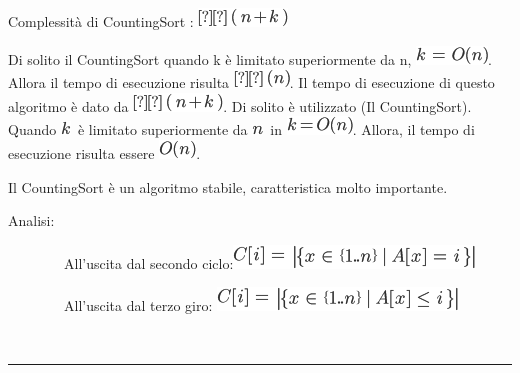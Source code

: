\documentclass{article}
\begin{document}
{Complessità di CountingSort : }\includegraphics{images/image188.png}

{}

{Di solito il CountingSort quando k è limitato superiormente da n,
}\includegraphics{images/image189.png}{. Allora il tempo di esecuzione
risulta }\includegraphics{images/image190.png}{. }{Il tempo di
esecuzione di questo algoritmo è dato da
}\includegraphics{images/image188.png}{. Di solito è utilizzato (Il
CountingSort). Quando }\includegraphics{images/image118.png}{~è limitato
superiormente da }\includegraphics{images/image41.png}{~in
}\includegraphics{images/image191.png}{. Allora, il tempo di esecuzione
risulta essere }\includegraphics{images/image146.png}{.}

{}

{Il CountingSort è un algoritmo stabile, caratteristica molto
importante.}

{}

{Analisi:}

{~~~~~~~~All'uscita dal secondo
ciclo:}\includegraphics{images/image192.png}

{~~~~~~~~All'uscita dal terzo giro:
}\includegraphics{images/image193.png}

{~~~~~~~~}

\begin{center}\rule{0.5\linewidth}{\linethickness}\end{center}
\end{document}
